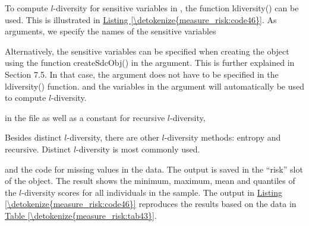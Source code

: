 \documentclass[letterpaper,10pt,english]{sphinxmanual}
\begin{document}
To compute \(l\)-diversity for sensitive variables in ,
the function ldiversity() can be used. This is illustrated in \hyperref[\detokenize{measure_risk:code46}]{Listing \ref{\detokenize{measure_risk:code46}}}.
As arguments, we specify the names of the sensitive
variables %
\begin{footnote}[9]\sphinxAtStartFootnote
Alternatively, the sensitive variables can be specified when
creating the  object using the function createSdcObj() in
the  argument. This is further explained in Section 7.5.
In that case, the argument  does not have to be specified
in the ldiversity() function. and the variables in the 
argument will automatically be used to compute \(l\)-diversity.
%
\end{footnote} in the file as well as a constant for
recursive \(l\)-diversity, %
\begin{footnote}[10]\sphinxAtStartFootnote
Besides distinct \(l\)-diversity, there are other
\(l\)-diversity methods: entropy and recursive. Distinct
\(l\)-diversity is most commonly used.
%
\end{footnote} and the code for
missing values in the data. The output is saved in the “risk” slot of
the  object. The result shows the minimum, maximum, mean and
quantiles of the \(l\)-diversity scores for all individuals in the
sample. The output in \hyperref[\detokenize{measure_risk:code46}]{Listing \ref{\detokenize{measure_risk:code46}}} reproduces the results based on the
data in \hyperref[\detokenize{measure_risk:tab43}]{Table \ref{\detokenize{measure_risk:tab43}}}.
\end{document}
